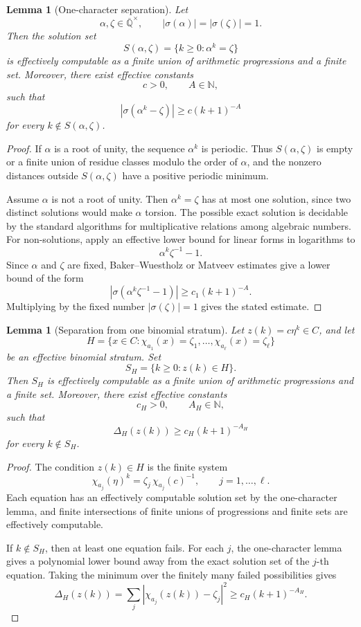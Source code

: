 \documentclass[11pt]{article}
\newtheorem{lemma}[theorem]{Lemma}
\newcommand{\Q}{\mathbb Q}
\begin{document}
\begin{lemma}[One-character separation]
Let
\[
\alpha,\zeta\in\overline{\Q}^{\times},
\qquad
|\sigma(\alpha)|=|\sigma(\zeta)|=1.
\]
Then the solution set
\[
S(\alpha,\zeta)=\{k\ge0:\alpha^k=\zeta\}
\]
is effectively computable as a finite union of arithmetic progressions and a finite set. Moreover, there exist effective constants
\[
c>0,
\qquad
A\in\mathbb N,
\]
such that
\[
|\sigma(\alpha^k-\zeta)|\ge c(k+1)^{-A}
\]
for every \(k\notin S(\alpha,\zeta)\).
\end{lemma}

\begin{proof}
If \(\alpha\) is a root of unity, the sequence \(\alpha^k\) is periodic. Thus \(S(\alpha,\zeta)\) is empty or a finite union of residue classes modulo the order of \(\alpha\), and the nonzero distances outside \(S(\alpha,\zeta)\) have a positive periodic minimum.

Assume \(\alpha\) is not a root of unity. Then \(\alpha^k=\zeta\) has at most one solution, since two distinct solutions would make \(\alpha\) torsion. The possible exact solution is decidable by the standard algorithms for multiplicative relations among algebraic numbers. For non-solutions, apply an effective lower bound for linear forms in logarithms to
\[
\alpha^k\zeta^{-1}-1.
\]
Since \(\alpha\) and \(\zeta\) are fixed, Baker--Wuestholz or Matveev estimates give a lower bound of the form
\[
|\sigma(\alpha^k\zeta^{-1}-1)|\ge c_1(k+1)^{-A}.
\]
Multiplying by the fixed number \(|\sigma(\zeta)|=1\) gives the stated estimate.
\end{proof}

\begin{lemma}[Separation from one binomial stratum]
Let \(z(k)=c\eta^k\in C\), and let
\[
H=
\{x\in C:\chi_{a_1}(x)=\zeta_1,\ldots,\chi_{a_\ell}(x)=\zeta_\ell\}
\]
be an effective binomial stratum. Set
\[
S_H=\{k\ge0:z(k)\in H\}.
\]
Then \(S_H\) is effectively computable as a finite union of arithmetic progressions and a finite set. Moreover, there exist effective constants
\[
c_H>0,
\qquad
A_H\in\mathbb N,
\]
such that
\[
\Delta_H(z(k))\ge c_H(k+1)^{-A_H}
\]
for every \(k\notin S_H\).
\end{lemma}

\begin{proof}
The condition \(z(k)\in H\) is the finite system
\[
\chi_{a_j}(\eta)^k
=
\zeta_j\,\chi_{a_j}(c)^{-1},
\qquad
j=1,\ldots,\ell.
\]
Each equation has an effectively computable solution set by the one-character lemma, and finite intersections of finite unions of progressions and finite sets are effectively computable.

If \(k\notin S_H\), then at least one equation fails. For each \(j\), the one-character lemma gives a polynomial lower bound away from the exact solution set of the \(j\)-th equation. Taking the minimum over the finitely many failed possibilities gives
\[
\Delta_H(z(k))
=
\sum_j|\chi_{a_j}(z(k))-\zeta_j|^2
\ge c_H(k+1)^{-A_H}.
\]
\end{proof}
\end{document}
